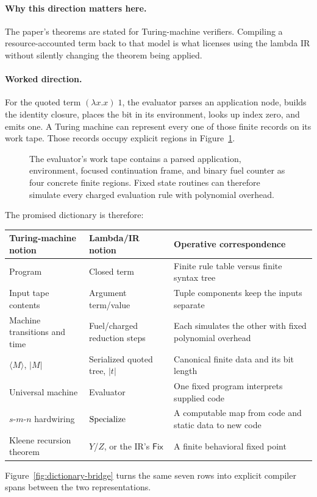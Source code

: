 \paragraph{Why this direction matters here.}
The paper's theorems are stated for Turing-machine verifiers.  Compiling a
resource-accounted term back to that model is what licenses using the lambda
IR without silently changing the theorem being applied.

\paragraph{Worked direction.}
For the quoted term \((\lambda x.x)\;1\), the evaluator parses an application
node, builds the identity closure, places the bit in its environment, looks up
index zero, and emits one.  A Turing machine can represent every one of those
finite records on its work tape.
Those records occupy explicit regions in Figure~\ref{fig:lambda-to-tm-layout}.

\begin{figure}[ht]
\centering

\caption{The evaluator's work tape contains a parsed application, environment, focused continuation frame, and binary fuel counter as four concrete finite regions.  Fixed state routines can therefore simulate every charged evaluation rule with polynomial overhead.}
\label{fig:lambda-to-tm-layout}
\end{figure}

The promised dictionary is therefore:
\begin{center}
\small
\begin{tabularx}{0.94\textwidth}{P{0.29\textwidth}P{0.29\textwidth}X}
\toprule
Turing-machine notion & Lambda/IR notion & Operative correspondence \\
\midrule
Program & Closed term & Finite rule table versus finite syntax tree \\
Input tape contents & Argument term/value & Tuple components keep the inputs
separate \\
Machine transitions and time & Fuel/charged reduction steps & Each simulates
the other with fixed polynomial overhead \\
\(\langle M\rangle\), \(|M|\) & Serialized quoted tree, \(|t|\) & Canonical
finite data and its bit length \\
Universal machine & Evaluator & One fixed program interprets supplied code \\
\(s\)-\(m\)-\(n\) hardwiring & \(\operatorname{Specialize}\) & A computable map from code
and static data to new code \\
Kleene recursion theorem & \(Y\)/\(Z\), or the IR's \(\mathsf{Fix}\) & A
finite behavioral fixed point \\
\bottomrule
\end{tabularx}
\end{center}
Figure~\ref{fig:dictionary-bridge} turns the same seven rows into explicit
compiler spans between the two representations.

